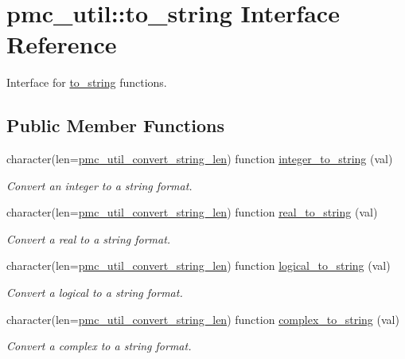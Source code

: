 \hypertarget{interfacepmc__util_1_1to__string}{}\section{pmc\+\_\+util\+:\+:to\+\_\+string Interface Reference}
\label{interfacepmc__util_1_1to__string}


Interface for \mbox{\hyperlink{interfacepmc__util_1_1to__string}{to\+\_\+string}} functions.  


\subsection*{Public Member Functions}
\begin{DoxyCompactItemize}
\item 
character(len=\mbox{\hyperlink{namespacepmc__util_afd468d26aef28509c08087ba8e59089a}{pmc\+\_\+util\+\_\+convert\+\_\+string\+\_\+len}}) function \mbox{\hyperlink{interfacepmc__util_1_1to__string_af83a2ce0f1a189f0d5027b423f111825}{integer\+\_\+to\+\_\+string}} (val)
\begin{DoxyCompactList}\small\item\em Convert an integer to a string format. \end{DoxyCompactList}\item 
character(len=\mbox{\hyperlink{namespacepmc__util_afd468d26aef28509c08087ba8e59089a}{pmc\+\_\+util\+\_\+convert\+\_\+string\+\_\+len}}) function \mbox{\hyperlink{interfacepmc__util_1_1to__string_aa387a4b44390560a847925ee65cc3e57}{real\+\_\+to\+\_\+string}} (val)
\begin{DoxyCompactList}\small\item\em Convert a real to a string format. \end{DoxyCompactList}\item 
character(len=\mbox{\hyperlink{namespacepmc__util_afd468d26aef28509c08087ba8e59089a}{pmc\+\_\+util\+\_\+convert\+\_\+string\+\_\+len}}) function \mbox{\hyperlink{interfacepmc__util_1_1to__string_a61e5236b08685163304f6f8cdec8a13a}{logical\+\_\+to\+\_\+string}} (val)
\begin{DoxyCompactList}\small\item\em Convert a logical to a string format. \end{DoxyCompactList}\item 
character(len=\mbox{\hyperlink{namespacepmc__util_afd468d26aef28509c08087ba8e59089a}{pmc\+\_\+util\+\_\+convert\+\_\+string\+\_\+len}}) function \mbox{\hyperlink{interfacepmc__util_1_1to__string_a114a44c00d9577503d304028962b77a1}{complex\+\_\+to\+\_\+string}} (val)
\begin{DoxyCompactList}\small\item\em Convert a complex to a string format. \end{DoxyCompactList}\end{DoxyCompactItemize}


